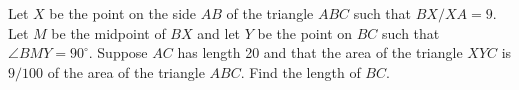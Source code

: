 Let $X$ be the point on the side $AB$ of the triangle $ABC$ such that $BX/XA =
9$. Let $M$ be the midpoint of $BX$ and let $Y$ be the point on $BC$ such that
$\angle BMY = 90^\circ$. Suppose $AC$ has length 20 and that the area of the
triangle $XYC$ is $9/100$ of the area of the triangle $ABC$. Find the length of
$BC$.
